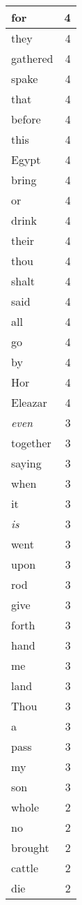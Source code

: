 \begin{center}
\begin{longtable}{l|r}
for & 4 \\ \hline
they & 4 \\ \hline
gathered & 4 \\ \hline
spake & 4 \\ \hline
that & 4 \\ \hline
before & 4 \\ \hline
this & 4 \\ \hline
Egypt & 4 \\ \hline
bring & 4 \\ \hline
or & 4 \\ \hline
drink & 4 \\ \hline
their & 4 \\ \hline
thou & 4 \\ \hline
shalt & 4 \\ \hline
said & 4 \\ \hline
all & 4 \\ \hline
go & 4 \\ \hline
by & 4 \\ \hline
Hor & 4 \\ \hline
Eleazar & 4 \\ \hline
\emph{even} & 3 \\ \hline
together & 3 \\ \hline
saying & 3 \\ \hline
when & 3 \\ \hline
it & 3 \\ \hline
\emph{is} & 3 \\ \hline
went & 3 \\ \hline
upon & 3 \\ \hline
rod & 3 \\ \hline
give & 3 \\ \hline
forth & 3 \\ \hline
hand & 3 \\ \hline
me & 3 \\ \hline
land & 3 \\ \hline
Thou & 3 \\ \hline
a & 3 \\ \hline
pass & 3 \\ \hline
my & 3 \\ \hline
son & 3 \\ \hline
whole & 2 \\ \hline
no & 2 \\ \hline
brought & 2 \\ \hline
cattle & 2 \\ \hline
die & 2 \\ \hline

\end{longtable}
\end{center}
